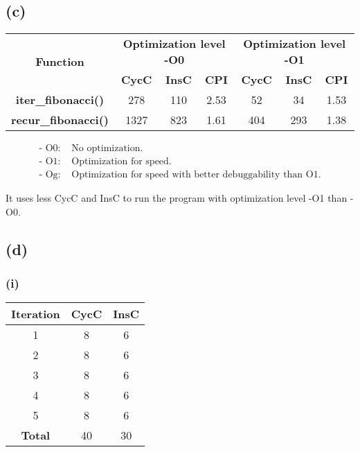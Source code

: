 \documentclass[12pt]{article}
\begin{document}
\subsection*{(c)}

\begin{center}
    \begin{tabular}{|c|c|c|c|c|c|c|}
    \hline
    \multirow{2}{*}{\textbf{Function}} & \multicolumn{3}{c|}{\textbf{Optimization level -O0}} & \multicolumn{3}{c|}{\textbf{Optimization level -O1}} \\
    \cline{2-7}
     & \textbf{CycC} & \textbf{InsC} & \textbf{CPI} & \textbf{CycC} & \textbf{InsC} & \textbf{CPI} \\
    \hline
    \textbf{iter\_fibonacci()} & 278 & 110 & 2.53 & 52 & 34 & 1.53 \\
    \hline
    \textbf{recur\_fibonacci()} & 1327 & 823 & 1.61 & 404 & 293 & 1.38 \\
    \hline
    \end{tabular}
\end{center}

\begin{align*}
\text{- O0: } & \text{No optimization.}\\[5pt]
\text{- O1: } & \text{Optimization for speed.}\\[5pt]
\text{- Og: } & \text{Optimization for speed with better debuggability than O1.}
\end{align*}

It uses less CycC and InsC to run the program with optimization level -O1 than -O0.

\subsection*{(d)}

\subsubsection*{(i)}

\begin{center}
    \begin{tabular}{|c|c|c|}
        \hline
        \textbf{Iteration} & \textbf{CycC} & \textbf{InsC} \\
        \hline
        1 & 8 & 6 \\
        \hline
        2 & 8 & 6 \\
        \hline
        3 & 8 & 6 \\
        \hline
        4 & 8 & 6 \\
        \hline
        5 & 8 & 6 \\
        \hline
        \textbf{Total} & 40 & 30 \\
        \hline
    \end{tabular}
\end{center}
\end{document}
